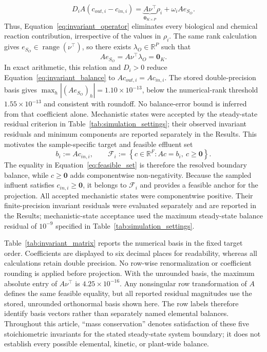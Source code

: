 \documentclass[a4paper,fleqn]{cas-sc}
\begin{document}
\begin{equation}
\label{eq:invariant_balance}
D_iA(c_{out,i}-c_{in,i})
=\underbrace{A\nu^\top}_{\mathbf{0}_{K\times P}}\rho_i+\omega_iAe_{S_O}.
\end{equation}
Thus, Equation~\eqref{eq:invariant_operator} eliminates every biological and chemical reaction contribution, irrespective of the values in $\rho_i$. The same rank calculation gives $e_{S_O}\in\operatorname{range}(\nu^\top)$, so there exists $\lambda_O\in\mathbb{R}^{P}$ such that
\begin{equation}
Ae_{S_O}=A\nu^\top\lambda_O=\mathbf{0}_K.
\end{equation}
In exact arithmetic, this relation and $D_i>0$ reduce Equation~\eqref{eq:invariant_balance} to $Ac_{out,i}=Ac_{in,i}$. The stored double-precision basis gives $\max_h|(Ae_{S_O})_h|=1.10\times10^{-13}$, below the numerical-rank threshold $1.55\times10^{-13}$ and consistent with roundoff. No balance-error bound is inferred from that coefficient alone. Mechanistic states were accepted by the steady-state residual criterion in Table~\ref{tab:simulation_settings}; their observed invariant residuals and minimum components are reported separately in the Results. This motivates the sample-specific target and feasible effluent set
\begin{equation}
\label{eq:feasible_set}
b_i:=A c_{in,i},\qquad
\mathcal{F}_i:=\left\{c\in\mathbb{R}^{F}:Ac=b_i,\ c\geq\mathbf{0}\right\}.
\end{equation}
The equality in Equation~\eqref{eq:feasible_set} is therefore the resolved boundary balance, while $c\geq\mathbf{0}$ adds componentwise non-negativity. Because the sampled influent satisfies $c_{in,i}\geq\mathbf{0}$, it belongs to $\mathcal{F}_i$ and provides a feasible anchor for the projection. All accepted mechanistic states were componentwise positive. Their finite-precision invariant residuals were evaluated separately and are reported in the Results; mechanistic-state acceptance used the maximum steady-state balance residual of $10^{-9}$ specified in Table~\ref{tab:simulation_settings}.

Table~\ref{tab:invariant_matrix} reports the numerical basis in the fixed target order. Coefficients are displayed to six decimal places for readability, whereas all calculations retain double precision. No row-wise renormalization or coefficient rounding is applied before projection. With the unrounded basis, the maximum absolute entry of $A\nu^\top$ is $4.25\times10^{-16}$. Any nonsingular row transformation of $A$ defines the same feasible equality, but all reported residual magnitudes use the stored, unrounded orthonormal basis shown here. The row labels therefore identify basis vectors rather than separately named elemental balances. Throughout this article, ``mass conservation'' denotes satisfaction of these five stoichiometric invariants for the stated steady-state system boundary; it does not establish every possible elemental, kinetic, or plant-wide balance.
\end{document}
